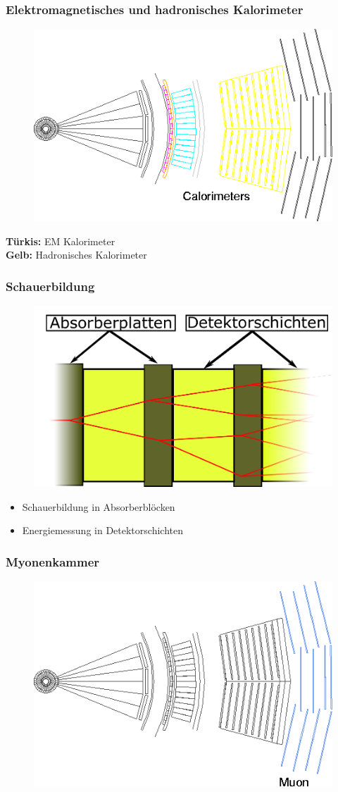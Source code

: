 \begin{frame}
	\frametitle{Elektromagnetisches und hadronisches Kalorimeter}
	\begin{center}
		\begin{figure}
			\includegraphics[width=0.75\linewidth]{graphics/slice_calorimeter_tr}
		\end{figure}
	\end{center}
	\textbf{Türkis: } EM Kalorimeter\\
	\textbf{Gelb: } Hadronisches Kalorimeter
\end{frame}
\begin{frame}
	\frametitle{Schauerbildung}
	\begin{figure}
		\centering
		\includegraphics[width=0.7\linewidth]{graphics/Kalorimeter}
	\end{figure}
	\begin{itemize}
		\item Schauerbildung in Absorberblöcken
		\item Energiemessung in Detektorschichten
	\end{itemize}
\end{frame}
\begin{frame}
	\frametitle{Myonenkammer}
	\begin{center}
		\begin{figure}
			\includegraphics[width=0.75\linewidth]{graphics/slice_muon_tr}
		\end{figure}
	\end{center}
\end{frame}


